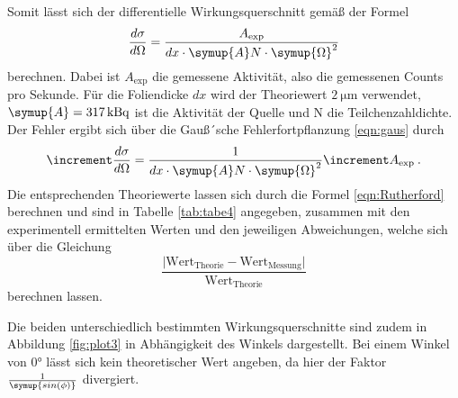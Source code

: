 Somit lässt sich der differentielle Wirkungsquerschnitt gemäß der Formel
\begin{equation}
  \frac{d\sigma}{d\Omega}= \frac{A_{\text{exp}}}{dx\cdot \symup{A} N \cdot \symup{\Omega}^2}
  \label{eqn:Wq}
\end{equation}
berechnen. Dabei ist $A_{\text{exp}}$ die gemessene Aktivität, also die gemessenen Counts
pro Sekunde. Für die Foliendicke $dx$ wird der Theoriewert $\SI{2}{\micro\metre}$ verwendet,
$\symup{A}=\SI{317}{\kilo\becquerel}$ ist die Aktivität der Quelle und N die Teilchenzahldichte.
Der Fehler ergibt sich über die Gauß´sche Fehlerfortpflanzung \eqref{eqn:gaus} durch
\begin{equation}
   \increment \frac{d\sigma}{d\Omega}= \frac{1}{dx\cdot \symup{A} N \cdot \symup{\Omega}^2}\increment A_{\text{exp}} \: .
   \label{eqn:dWq}
\end{equation}
Die entsprechenden Theoriewerte lassen sich durch die Formel \eqref{eqn:Rutherford} berechnen und sind in Tabelle
\ref{tab:tabe4} angegeben, zusammen mit den experimentell ermittelten Werten und den jeweiligen Abweichungen,
welche sich über die Gleichung
\begin{equation}
  \frac{\lvert \text{Wert}_{\text{Theorie}}-\text{Wert}_{\text{Messung}}\rvert}{\text{Wert}_{\text{Theorie}}}
  \label{eqn:abw}
\end{equation}
berechnen lassen.

Die beiden unterschiedlich bestimmten Wirkungsquerschnitte sind zudem in Abbildung \ref{fig:plot3}
in Abhängigkeit des Winkels dargestellt. Bei einem Winkel von 0° lässt sich kein theoretischer Wert angeben,
da hier der Faktor $\frac{1}{\symup{sin(\phi)}}$ divergiert.
